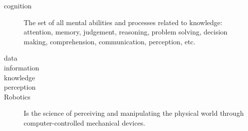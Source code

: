 \begin{description}
\item[cognition] The set of all mental abilities and processes related to knowledge: attention, memory, judgement, reasoning, problem solving, decision making, comprehension, communication, perception, etc.
\item[data]
\item[information]
\item[knowledge]
\item[perception]
\item[Robotics] Is the science of perceiving and manipulating the physical world through computer-controlled mechanical devices. %
\end{description}